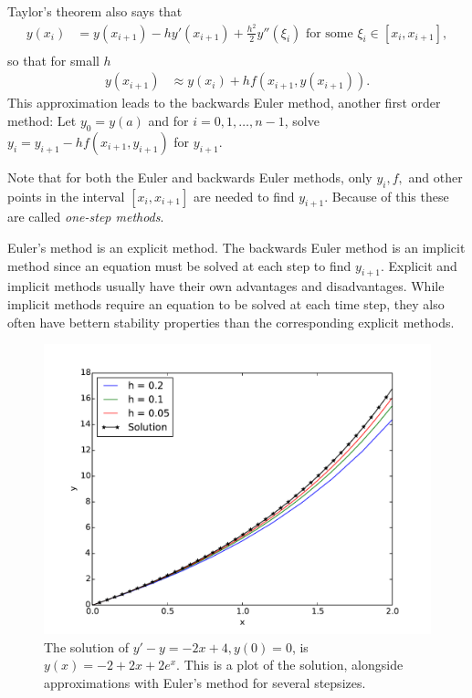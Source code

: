 Taylor's theorem also says that 
\begin{align*}
y(x_{i}) &= y(x_{i+1}) - h y'(x_{i+1}) + \frac{h^2}{2} y''(\xi_i) \text{ for some } \xi_i \in [x_i,x_{i+1}], \\
\end{align*}
so that for small $h$
\begin{align*}
y(x_{i+1}) &\approx  y(x_{i}) + h f(x_{i+1},y(x_{i+1})).
\end{align*}
This approximation leads to the backwards Euler method, another first order method: Let $y_0 = y(a)$ and for $i = 0, 1, \hdots, n-1$, solve  $y_{i} = y_{i+1}-hf(x_{i+1},y_{i+1})$ for $y_{i+1}$.

Note that for both the Euler and backwards Euler methods, only $y_i, f, $ and other points in the interval $[x_i, x_{i+1}]$ are needed to find $y_{i+1}$. Because of this these are called \textit{one-step methods}. 

Euler's method is an explicit method. The backwards Euler method is an implicit method since an equation must be solved at each step to find $y_{i+1}$. Explicit and implicit methods usually have their own advantages and disadvantages. While implicit methods require an equation to be solved at each time step, they also often have bettern stability properties than the corresponding explicit methods.

\begin{figure}[ht]
\centering
\includegraphics[width=\textwidth]{Fig1.pdf}
\caption{The solution of $y' -y= -2x+4, y(0) = 0$, is $y(x) = -2+2x + 2e^x.$ This is a plot of the solution, alongside approximations with Euler's method for several stepsizes.}
\label{ivp:euler}
\end{figure}


